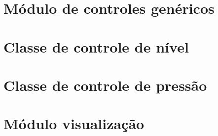 \chapter{\label{controllers_generic}Módulo de controles genéricos}

\chapter{\label{controllers_level}Classe de controle de nível}

\chapter{\label{controllers_pressure}Classe de controle de pressão}

\chapter{\label{viewer_main}Módulo visualização}
